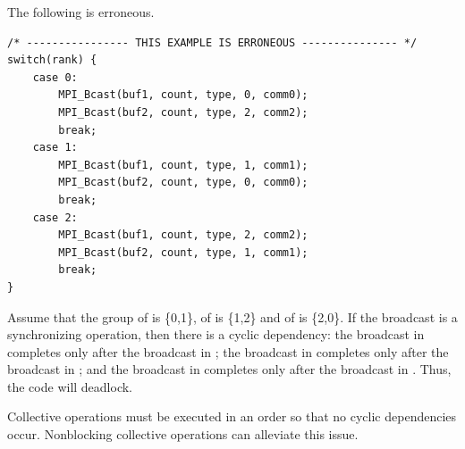 \begin{example}
\label{coll-excorr2}
%
%
The following is erroneous.

\begin{lstlisting}[language={[MPI]C}]
/* ---------------- THIS EXAMPLE IS ERRONEOUS --------------- */
switch(rank) {
    case 0:
        MPI_Bcast(buf1, count, type, 0, comm0);
        MPI_Bcast(buf2, count, type, 2, comm2);
        break;
    case 1:
        MPI_Bcast(buf1, count, type, 1, comm1);
        MPI_Bcast(buf2, count, type, 0, comm0);
        break;
    case 2:
        MPI_Bcast(buf1, count, type, 2, comm2);
        MPI_Bcast(buf2, count, type, 1, comm1);
        break;
}
\end{lstlisting}

Assume that the group of
 is \{0,1\}, of  is \{1,2\} and of 
is \{2,0\}.  If the broadcast is a synchronizing operation, then there
is a cyclic dependency: the broadcast in  completes only
after the broadcast in ; the broadcast in 
completes only after the broadcast in ; and the broadcast
in  completes only after the broadcast in .
Thus, the code will deadlock.

Collective operations must be executed in an order so that
no cyclic dependencies occur. Nonblocking collective operations can
alleviate this issue.
\end{example}


